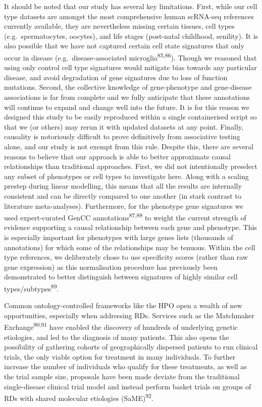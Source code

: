 \documentclass[
]{article}
\begin{document}
It should be noted that our study has several key limitations. First,
while our cell type datasets are amongst the most comprehensive human
scRNA-seq references currently available, they are nevertheless missing
certain tissues, cell types (e.g.~spermatocytes, oocytes), and life
stages (post-natal childhood, senility). It is also possible that we
have not captured certain cell state signatures that only occur in
disease (e.g.~disease-associated microglia\textsuperscript{85,86}).
Though we reasoned that using only control cell type signatures would
mitigate bias towards any particular disease, and avoid degradation of
gene signatures due to loss of function mutations. Second, the
collective knowledge of gene-phenotype and gene-disease associations is
far from complete and we fully anticipate that these annotations will
continue to expand and change well into the future. It is for this
reason we designed this study to be easily reproduced within a single
containerised script so that we (or others) may rerun it with updated
datasets at any point. Finally, causality is notoriously difficult to
prove definitively from associative testing alone, and our study is not
exempt from this rule. Despite this, there are several reasons to
believe that our approach is able to better approximate causal
relationships than traditional approaches. First, we did not
intentionally preselect any subset of phenotypes or cell types to
investigate here. Along with a scaling prestep during linear modelling,
this means that all the results are internally consistent and can be
directly compared to one another (in stark contrast to literature
meta-analyses). Furthermore, for the phenotype gene signatures we used
expert-curated GenCC annotations\textsuperscript{87,88} to weight the
current strength of evidence supporting a causal relationship between
each gene and phenotype. This is especially important for phenotypes
with large genes lists (thousands of annotations) for which some of the
relationships may be tenuous. Within the cell type references, we
deliberately chose to use specificity scores (rather than raw gene
expression) as this normalisation procedure has previously been
demonstrated to better distinguish between signatures of highly similar
cell types/subtypes\textsuperscript{89}.

Common ontology-controlled frameworks like the HPO open a wealth of new
opportunities, especially when addressing RDs. Services such as the
Matchmaker Exchange\textsuperscript{90,91} have enabled the discovery of
hundreds of underlying genetic etiologies, and led to the diagnosis of
many patients. This also opens the possibility of gathering cohorts of
geographically dispersed patients to run clinical trials, the only
viable option for treatment in many individuals. To further increase the
number of individuals who qualify for these treatments, as well as the
trial sample size, proposals have been made deviate from the traditional
single-disease clinical trial model and instead perform basket trials on
groups of RDs with shared molecular etiologies
(SaME)\textsuperscript{92}.
\end{document}
